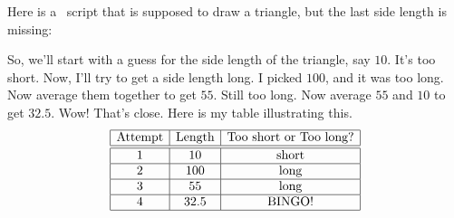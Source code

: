\documentclass[handout,nooutcomes,noauthor]{ximera}
\begin{document}
\begin{question}
  Here is a \snap\ script that is supposed to draw a triangle, but the
  last side length is missing:
  
  \begin{freeResponse}
    So, we'll start with a guess for the side length of the triangle,
    say $10$. It's too short. Now, I'll try to get a side length
    long. I picked $100$, and it was too long. Now average them
    together to get $55$. Still too long. Now average $55$ and $10$ to get $32.5$. Wow! That's close.  Here is my table
    illustrating this.
    \[
  \begin{array}{|c|c|c|c|}\hline
    \text{Attempt} & \text{Length} & \text{Too short or Too long?} \\ \hline\hline
    1 & 10 & \text{short} \\ \hline
    2 & 100 & \text{long} \\ \hline
    3 & 55 & \text{long} \\ \hline
    4 & 32.5 & \text{BINGO!} \\ \hline
  \end{array}
  \]
\end{freeResponse}
\end{question}
\mynewpage
\end{document}
